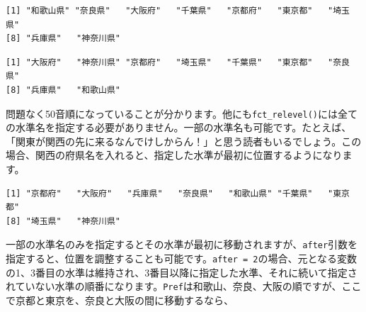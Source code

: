 \documentclass[
  a4paper,
  pandoc,
  ja=standard,
  jafont=haranoaji]{bxjsbook}
\newenvironment{Shaded}{\begin{snugshade}}{\end{snugshade}}
\newcommand{\AttributeTok}[1]{\textcolor[rgb]{0.00,0.48,0.65}{#1}}
\newcommand{\CommentTok}[1]{\textcolor[rgb]{0.37,0.37,0.37}{#1}}
\newcommand{\FunctionTok}[1]{\textcolor[rgb]{0.28,0.35,0.67}{#1}}
\newcommand{\NormalTok}[1]{\textcolor[rgb]{0.00,0.48,0.65}{#1}}
\newcommand{\OtherTok}[1]{\textcolor[rgb]{0.00,0.48,0.65}{#1}}
\newcommand{\SpecialCharTok}[1]{\textcolor[rgb]{0.37,0.37,0.37}{#1}}
\newcommand{\StringTok}[1]{\textcolor[rgb]{0.13,0.47,0.30}{#1}}
\begin{document}
\begin{verbatim}
[1] "和歌山県" "奈良県"   "大阪府"   "千葉県"   "京都府"   "東京都"   "埼玉県"  
[8] "兵庫県"   "神奈川県"
\end{verbatim}

\begin{Shaded}
\end{Shaded}

\begin{verbatim}
[1] "大阪府"   "神奈川県" "京都府"   "埼玉県"   "千葉県"   "東京都"   "奈良県"  
[8] "兵庫県"   "和歌山県"
\end{verbatim}

問題なく50音順になっていることが分かります。他にも\texttt{fct\_relevel()}には全ての水準名を指定する必要がありません。一部の水準名も可能です。たとえば、「関東が関西の先に来るなんでけしからん！」と思う読者もいるでしょう。この場合、関西の府県名を入れると、指定した水準が最初に位置するようになります。

\begin{Shaded}
\end{Shaded}

\begin{verbatim}
[1] "京都府"   "大阪府"   "兵庫県"   "奈良県"   "和歌山県" "千葉県"   "東京都"  
[8] "埼玉県"   "神奈川県"
\end{verbatim}

一部の水準名のみを指定するとその水準が最初に移動されますが、\texttt{after}引数を指定すると、位置を調整することも可能です。\texttt{after\ =\ 2}の場合、元となる変数の1、3番目の水準は維持され、3番目以降に指定した水準、それに続いて指定されていない水準の順番になります。\texttt{Pref}は和歌山、奈良、大阪の順ですが、ここで京都と東京を、奈良と大阪の間に移動するなら、
\end{document}
